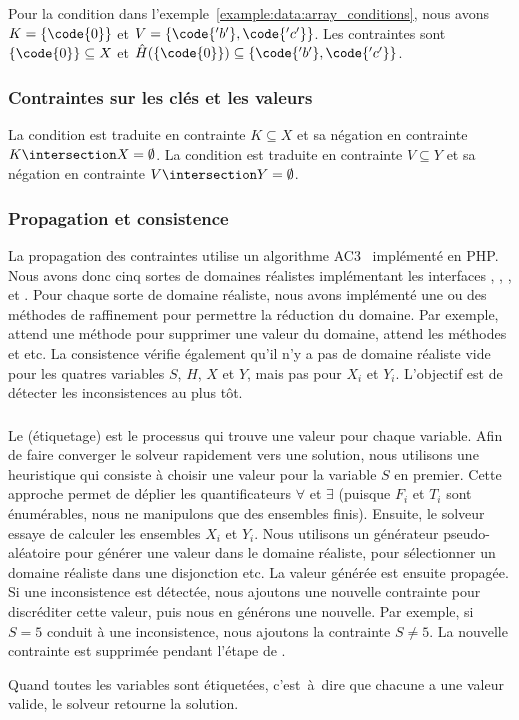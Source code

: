 Pour la condition  dans
l'exemple~\ref{example:data:array_conditions}, nous avons $K = \{\code{0}\}$ et
$V = \{\code{'b'}, \code{'c'}\}$. Les contraintes sont $\{\code{0}\} \subseteq
X$ et $\hat{H}(\{\code{0}\}) \subseteq \{\code{'b'}, \code{'c'}\}$.

\subsubsection{Contraintes sur les clés et les valeurs}

La condition  est traduite en contrainte $K \subseteq X$ et sa
négation  en contrainte $K \intersection X = \emptyset$. La
condition  est traduite en contrainte $V \subseteq Y$ et sa
négation  en contrainte $V \intersection Y = \emptyset$.

\subsubsection{Propagation et consistence}

La propagation des contraintes utilise un algorithme AC3~
implémenté en PHP. Nous avons donc cinq sortes de domaines réalistes
implémentant les interfaces , , ,
 et . Pour chaque sorte de domaine réaliste, nous
avons implémenté une ou des méthodes de raffinement pour permettre la réduction
du domaine. Par exemple,  attend une méthode 
pour supprimer une valeur du domaine,  attend les méthodes
 et  etc. La consistence vérifie
également qu'il n'y a pas de domaine réaliste vide pour les quatres variables
$S$, $H$, $X$ et $Y$, mais pas pour $X_i$ et $Y_i$. L'objectif est de détecter
les inconsistences au plus tôt.

\subsubsection{}

Le  (étiquetage) est le processus qui trouve une valeur
pour chaque variable. Afin de faire converger le solveur rapidement vers une
solution, nous utilisons une heuristique qui consiste à choisir une valeur pour
la variable $S$ en premier. Cette approche permet de déplier les quantificateurs
$\forall$ et $\exists$ (puisque $F_i$ et $T_i$ sont énumérables, nous ne
manipulons que des ensembles finis). Ensuite, le solveur essaye de calculer les
ensembles $X_i$ et $Y_i$. Nous utilisons un générateur pseudo-aléatoire pour
générer une valeur dans le domaine réaliste, pour sélectionner un domaine
réaliste dans une disjonction etc. La valeur générée est ensuite propagée. Si
une inconsistence est détectée, nous ajoutons une nouvelle contrainte pour
discréditer cette valeur, puis nous en générons une nouvelle. Par exemple, si $S
= 5$ conduit à une inconsistence, nous ajoutons la contrainte $S \neq 5$. La
nouvelle contrainte est supprimée pendant l'étape de .

Quand toutes les variables sont étiquetées, c'est~à~dire que chacune a une valeur
valide, le solveur retourne la solution.
